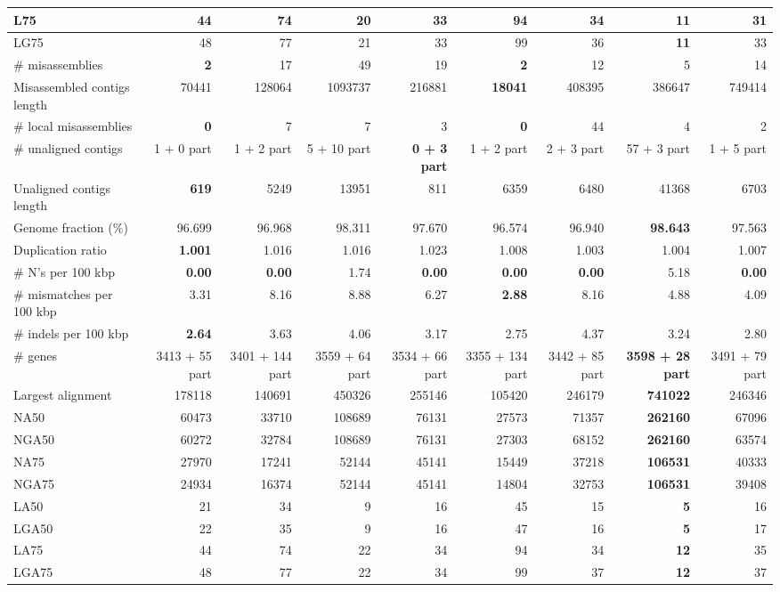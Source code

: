 \documentclass[12pt,a4paper]{article}
\begin{document}
\begin{table}[ht]
\begin{center}
\begin{tabular}{|l*{8}{|r}|}
L75 & 44 & 74 & 20 & 33 & 94 & 34 & {\bf 11} & 31 \\ \hline
LG75 & 48 & 77 & 21 & 33 & 99 & 36 & {\bf 11} & 33 \\ \hline
\# misassemblies & {\bf 2} & 17 & 49 & 19 & {\bf 2} & 12 & 5 & 14 \\ \hline
Misassembled contigs length & 70441 & 128064 & 1093737 & 216881 & {\bf 18041} & 408395 & 386647 & 749414 \\ \hline
\# local misassemblies & {\bf 0} & 7 & 7 & 3 & {\bf 0} & 44 & 4 & 2 \\ \hline
\# unaligned contigs & 1 + 0 part & 1 + 2 part & 5 + 10 part & {\bf 0 + 3 part} & 1 + 2 part & 2 + 3 part & 57 + 3 part & 1 + 5 part \\ \hline
Unaligned contigs length & {\bf 619} & 5249 & 13951 & 811 & 6359 & 6480 & 41368 & 6703 \\ \hline
Genome fraction (\%) & 96.699 & 96.968 & 98.311 & 97.670 & 96.574 & 96.940 & {\bf 98.643} & 97.563 \\ \hline
Duplication ratio & {\bf 1.001} & 1.016 & 1.016 & 1.023 & 1.008 & 1.003 & 1.004 & 1.007 \\ \hline
\# N's per 100 kbp & {\bf 0.00} & {\bf 0.00} & 1.74 & {\bf 0.00} & {\bf 0.00} & {\bf 0.00} & 5.18 & {\bf 0.00} \\ \hline
\# mismatches per 100 kbp & 3.31 & 8.16 & 8.88 & 6.27 & {\bf 2.88} & 8.16 & 4.88 & 4.09 \\ \hline
\# indels per 100 kbp & {\bf 2.64} & 3.63 & 4.06 & 3.17 & 2.75 & 4.37 & 3.24 & 2.80 \\ \hline
\# genes & 3413 + 55 part & 3401 + 144 part & 3559 + 64 part & 3534 + 66 part & 3355 + 134 part & 3442 + 85 part & {\bf 3598 + 28 part} & 3491 + 79 part \\ \hline
Largest alignment & 178118 & 140691 & 450326 & 255146 & 105420 & 246179 & {\bf 741022} & 246346 \\ \hline
NA50 & 60473 & 33710 & 108689 & 76131 & 27573 & 71357 & {\bf 262160} & 67096 \\ \hline
NGA50 & 60272 & 32784 & 108689 & 76131 & 27303 & 68152 & {\bf 262160} & 63574 \\ \hline
NA75 & 27970 & 17241 & 52144 & 45141 & 15449 & 37218 & {\bf 106531} & 40333 \\ \hline
NGA75 & 24934 & 16374 & 52144 & 45141 & 14804 & 32753 & {\bf 106531} & 39408 \\ \hline
LA50 & 21 & 34 & 9 & 16 & 45 & 15 & {\bf 5} & 16 \\ \hline
LGA50 & 22 & 35 & 9 & 16 & 47 & 16 & {\bf 5} & 17 \\ \hline
LA75 & 44 & 74 & 22 & 34 & 94 & 34 & {\bf 12} & 35 \\ \hline
LGA75 & 48 & 77 & 22 & 34 & 99 & 37 & {\bf 12} & 37 \\ \hline
\end{tabular}
\end{center}
\end{table}
\end{document}

